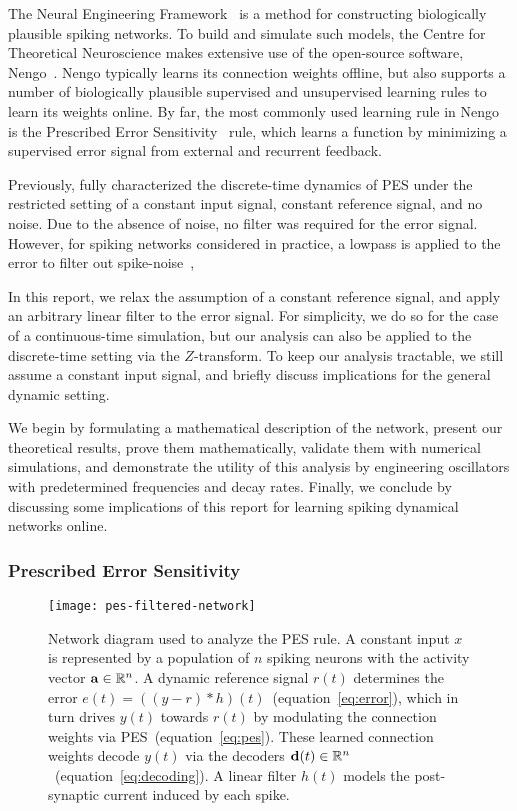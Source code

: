 The Neural Engineering Framework~\citep[NEF;][]{eliasmith2003a} is a method for constructing biologically plausible spiking networks.
To build and simulate such models, the Centre for Theoretical Neuroscience makes extensive use of the open-source software, Nengo~\citep{bekolay2014}. 
Nengo typically learns its connection weights offline, but also supports a number of biologically plausible supervised and unsupervised learning rules to learn its weights online.
By far, the most commonly used learning rule in Nengo is the Prescribed Error Sensitivity~\citep[PES;][]{bekolay2013} rule, which learns a function by minimizing a supervised error signal from external and recurrent feedback.

Previously, \citet{voelker2015} fully characterized the discrete-time dynamics of PES under the restricted setting of a constant input signal, constant reference signal, and no noise.
Due to the absence of noise, no filter was required for the error signal.
However, for spiking networks considered in practice, a lowpass is applied to the error to filter out spike-noise~\citep[e.g.,][]{dewolf2016, rasmussen2017},  

In this report, we relax the assumption of a constant reference signal, and apply an arbitrary linear filter to the error signal.
For simplicity, we do so for the case of a continuous-time simulation, but our analysis can also be applied to the discrete-time setting via the $Z$-transform.
To keep our analysis tractable, we still assume a constant input signal, and briefly discuss implications for the general dynamic setting.

We begin by formulating a mathematical description of the network, present our theoretical results, prove them mathematically, validate them with numerical simulations, and demonstrate the utility of this analysis by engineering oscillators with predetermined frequencies and decay rates.
Finally, we conclude by discussing some implications of this report for learning spiking dynamical networks online.

\subsubsection{Prescribed Error Sensitivity}

\begin{figure}
\centering
\texttt{[image: pes-filtered-network]}
\caption{\label{fig:pes-filtered-network}
  Network diagram used to analyze the PES rule.
  A constant input $x$ is represented by a population of $n$ spiking neurons with the activity vector $\mathbf{a} \in \mathbb{R}^n$.
  A dynamic reference signal $r(t)$ determines the error $e(t) = \left((y - r) \ast h\right)(t)$~(equation~\ref{eq:error}), which in turn drives $y(t)$ towards $r(t)$ by modulating the connection weights via PES~(equation~\ref{eq:pes}).
  These learned connection weights decode $y(t)$ via the decoders $\mathbf{d}(t) \in \mathbb{R}^n$~(equation~\ref{eq:decoding}).
  A linear filter $h(t)$ models the post-synaptic current induced by each spike.
}
\end{figure}


